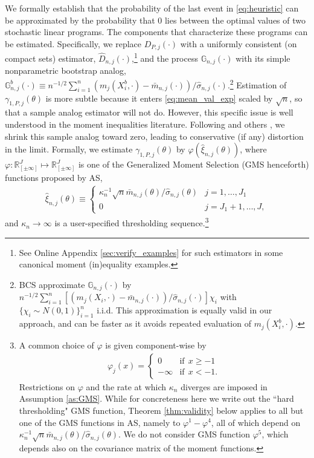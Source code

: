 \documentclass[letterpaper,11pt]{article}
\theoremstyle{myplain}
\theoremstyle{mydefinition}
\theoremstyle{myremark}
\renewcommand{\cite}{\citet}
\newcommand{\G}{\mathbb{G}}
\newcommand{\R}{\mathbb{R}}
\numberwithin{equation}{section}
\numberwithin{figure}{section}
\begin{document}
We formally establish that the probability of the last event in \eqref{eq:heuristic} can be approximated by the probability that $0$ lies between the optimal values of two stochastic linear programs. The components that characterize these programs can be estimated. Specifically, we replace $D_{P,j}(\cdot)$ with a uniformly consistent (on compact sets) estimator, $\hat{D}_{n,j}(\cdot)$,\footnote{See Online Appendix \ref{sec:verify_examples} for such estimators in some canonical moment (in)equality examples.} and the process $\mathbb G_{n,j}(\cdot)$ with its simple nonparametric bootstrap analog, $\mathbb G^b_{n,j}(\cdot)\equiv n^{-1/2}\sum_{i=1}^{n} (m_{j}(X_{i}^{b},\cdot)-\bar{m}_{n,j}(\cdot))/\hat{\sigma}_{n,j}(\cdot )$.\footnote{BCS approximate $\G_{n,j}(\cdot)$ by $n^{-1/2}\sum_{i=1}^{n} [(m_{j}(X_{i},\cdot)-\bar{m}_{n,j}(\cdot))/\hat{\sigma}_{n,j}(\cdot )]\chi_i$ with $\{\chi_i\sim N(0,1)\}_{i=1}^n$ i.i.d. This approximation is equally valid in our approach, and can be faster as it avoids repeated evaluation of $m_{j}(X^b_{i},\cdot)$.} Estimation of $\gamma_{1,P,j}(\theta)$ is more subtle because it enters \eqref{eq:mean_val_exp} scaled by $\sqrt{n}$, so that a sample analog estimator will not do. However, this specific issue is well understood in the moment inequalities literature. Following \cite[][AS henceforth]{AS} and others \citep{Bugni2009E,Canay2010JE,Stoye09}, we shrink this sample analog toward zero, leading to conservative (if any) distortion in the limit. Formally, we estimate $\gamma_{1,P,j}(\theta)$ by $\varphi(\hat{\xi}_{n,j}(\theta))$, where $\varphi:\R^J_{[\pm\infty]} \mapsto \R^J_{[\pm\infty]}$ is one of the Generalized Moment Selection (GMS henceforth) functions proposed by AS,
\begin{align}
\label{eq:hat_xi}
\hat{\xi}_{n,j}(\theta)\equiv\begin{cases}
 \kappa_n^{-1}\sqrt n\bar m_{n,j}(\theta)/\hat\sigma_{n,j}(\theta) & j=1,\dots,J_1\\
 0 & j=J_1+1,\dots,J,
 \end{cases}
\end{align}
and $\kappa_n\to \infty$ is a user-specified thresholding sequence.\footnote{\label{fn:eq:zeta}A common choice of $\varphi$ is given component-wise by
	\begin{align*}
	
		\varphi_j(x)=\begin{cases}
			0&\text{if}~~x\ge -1\\
			-\infty&\text{if}~~x< -1.
		\end{cases}
	\end{align*}
Restrictions on $\varphi$ and the rate at which $\kappa_n$ diverges are imposed in Assumption \ref{as:GMS}.
While for concreteness here we write out the ``hard thresholding" GMS function, Theorem \ref{thm:validity} below applies to all but one of the GMS functions in AS, namely to $\varphi^1-\varphi^4$, all of which depend on $\kappa_n^{-1}\sqrt n\bar m_{n,j}(\theta)/\hat\sigma_{n,j}(\theta)$. We do not consider GMS function $\varphi^5$, which depends also on the covariance matrix of the moment functions.}
\end{document}
